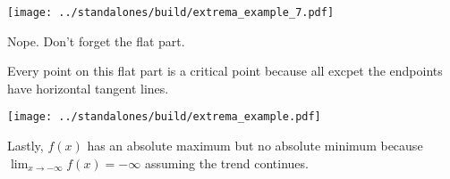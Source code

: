 \documentclass[12pt]{beamer}
\begin{document}
\begin{frame}[t]
  \texttt{[image: ../standalones/build/extrema\_example\_7.pdf]}
  
  Nope. Don't forget the flat part. 

  Every point on this flat part is a critical point because all excpet the endpoints have horizontal tangent lines.
\end{frame}


\begin{frame}[t]
  \texttt{[image: ../standalones/build/extrema\_example.pdf]}

  Lastly, \(f(x)\) has an absolute maximum but no absolute minimum because \(\lim_{x \to -\infty} f(x) = -\infty\) assuming the trend continues.
\end{frame}
\end{document}
